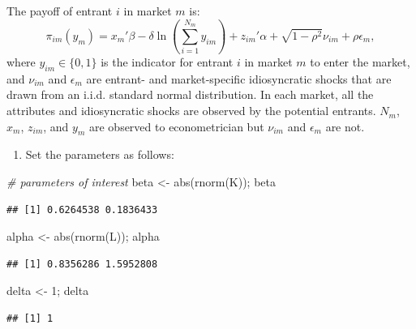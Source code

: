 \documentclass[
]{book}
\newenvironment{Shaded}{\begin{snugshade}}{\end{snugshade}}
\newcommand{\CommentTok}[1]{\textcolor[rgb]{0.56,0.35,0.01}{\textit{#1}}}
\newcommand{\DecValTok}[1]{\textcolor[rgb]{0.00,0.00,0.81}{#1}}
\newcommand{\FunctionTok}[1]{\textcolor[rgb]{0.00,0.00,0.00}{#1}}
\newcommand{\NormalTok}[1]{#1}
\newcommand{\OtherTok}[1]{\textcolor[rgb]{0.56,0.35,0.01}{#1}}
\providecommand{\tightlist}{%
  \setlength{\itemsep}{0pt}\setlength{\parskip}{0pt}}
\begin{document}
The payoff of entrant \(i\) in market \(m\) is:
\[
\pi_{im}(y_m) = x_m'\beta - \delta \ln \left(\sum_{i = 1}^{N_m} y_{im}\right) + z_{im}'\alpha + \sqrt{1 - \rho^2} \nu_{im} + \rho \epsilon_{m},
\]
where \(y_{im} \in \{0, 1\}\) is the indicator for entrant \(i\) in market \(m\) to enter the market, and \(\nu_{im}\) and \(\epsilon_m\) are entrant- and market-specific idiosyncratic shocks that are drawn from an i.i.d. standard normal distribution. In each market, all the attributes and idiosyncratic shocks are observed by the potential entrants. \(N_m\), \(x_m\), \(z_{im}\), and \(y_m\) are observed to econometrician but \(\nu_{im}\) and \(\epsilon_m\) are not.

\begin{enumerate}
\def\labelenumi{\arabic{enumi}.}
\setcounter{enumi}{1}
\tightlist
\item
  Set the parameters as follows:
\end{enumerate}

\begin{Shaded}
\begin{Highlighting}[]
\CommentTok{\# parameters of interest}
\NormalTok{beta }\OtherTok{\textless{}{-}} \FunctionTok{abs}\NormalTok{(}\FunctionTok{rnorm}\NormalTok{(K)); beta}
\end{Highlighting}
\end{Shaded}

\begin{verbatim}
## [1] 0.6264538 0.1836433
\end{verbatim}

\begin{Shaded}
\begin{Highlighting}[]
\NormalTok{alpha }\OtherTok{\textless{}{-}} \FunctionTok{abs}\NormalTok{(}\FunctionTok{rnorm}\NormalTok{(L)); alpha}
\end{Highlighting}
\end{Shaded}

\begin{verbatim}
## [1] 0.8356286 1.5952808
\end{verbatim}

\begin{Shaded}
\begin{Highlighting}[]
\NormalTok{delta }\OtherTok{\textless{}{-}} \DecValTok{1}\NormalTok{; delta}
\end{Highlighting}
\end{Shaded}

\begin{verbatim}
## [1] 1
\end{verbatim}
\end{document}
